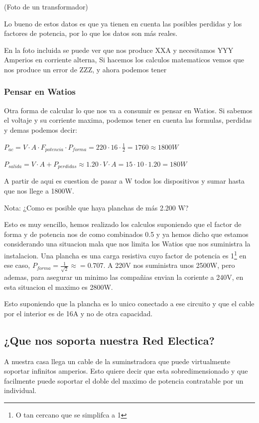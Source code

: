 (Foto de un transformador)

Lo bueno de estos datos es que ya tienen en cuenta las posibles perdidas y los factores de potencia, por lo que los datos son más reales.

En la foto incluida se puede ver que nos produce XXA y necesitamos YYY Amperios en corriente alterna, Si hacemos los calculos matematicos vemos que nos produce un error de ZZZ, y ahora podemos tener

\subsubsection{Pensar en Watios}

Otra forma de calcular lo que nos va a consumir es pensar en Watios. Si sabemos el voltaje y su corriente maxima, podemos tener en cuenta las formulas, perdidas y demas podemos decir:

$P_{ac}=V\cdot A \cdot F_{potencia}\cdot P_{forma}=220 \cdot 16 \cdot \frac{1}{2} = 1760 \approx 1800W$

$P_{salida}= V\cdot A +P_{perdidas}\approx 1.20\cdot V\cdot A =15 \cdot 10 \cdot 1.20=180W$

A partir de aqui es cuestion de pasar a W todos los dispositivos y sumar hasta que nos llege a 1800W.

Nota: ¿Como es posible que haya planchas de más 2.200 W? 

Esto es muy sencillo, hemos realizado los calculos suponiendo que el factor de forma y de potencia nos de como combinados 0.5 y ya hemos dicho que estamos considerando una situacion mala que nos limita los Watios que nos suministra la instalacion. Una plancha es una carga resistiva cuyo factor de potencia es 1\footnote{O tan cercano que se simplifca a 1} en ese caso, $P_{forma}=\frac{1}{\sqrt{2}}\approx=0.707$. A 220V nos suministra unos 2500W, pero ademas, para asegurar un minimo las compañias envian la coriente a 240V, en esta situacion el maximo es 2800W.

Esto suponiendo que la plancha es lo unico conectado a ese circuito y que el cable por el interior es de 16A y no de otra capacidad.


\subsection{¿Que nos soporta nuestra Red Electica?}
A nuestra casa llega un cable de la suminstradora que puede virtualmente soportar infinitos amperios. Esto quiere decir que esta sobredimensionado y que facilmente puede soportar el doble del maximo de potencia contratable por un individual.

